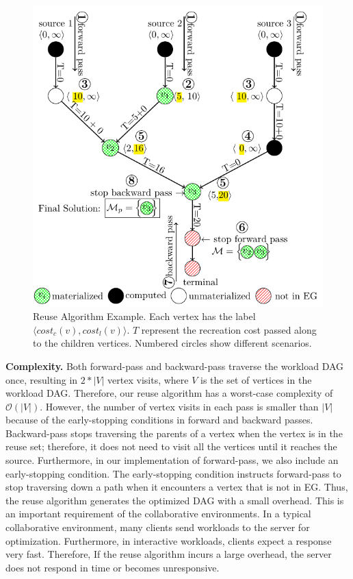 \begin{figure}
\centering
\includegraphics[width=\linewidth]{../images/tikz-standalone/reuse-algorithm}
\caption{Reuse Algorithm Example. Each vertex has the label $\langle cost_c(v),cost_l(v) \rangle$. $T$ represent the recreation cost passed along to the children vertices. Numbered circles show different scenarios.}
\label{fig-reuse-algorithm}
\end{figure}

\textbf{Complexity.} 
Both forward-pass and backward-pass traverse the workload DAG once, resulting in $2*|V|$ vertex visits, where $V$ is the set of vertices in the workload DAG.
Therefore, our reuse algorithm has a worst-case complexity of $\mathcal{O}(|V|)$.
However, the number of vertex visits in each pass is smaller than $|V|$ because of the early-stopping conditions in forward and backward passes.
Backward-pass stops traversing the parents of a vertex when the vertex is in the reuse set; therefore, it does not need to visit all the vertices until it reaches the source.
Furthermore, in our implementation of forward-pass, we also include an early-stopping condition.
The early-stopping condition instructs forward-pass to stop traversing down a path when it encounters a vertex that is not in EG.
Thus, the reuse algorithm generates the optimized DAG with a small overhead.
This is an important requirement of the collaborative environments.
In a typical collaborative environment, many clients send workloads to the server for optimization.
Furthermore, in interactive workloads, clients expect a response very fast.
Therefore, If the reuse algorithm incurs a large overhead, the server does not respond in time or becomes unresponsive.

